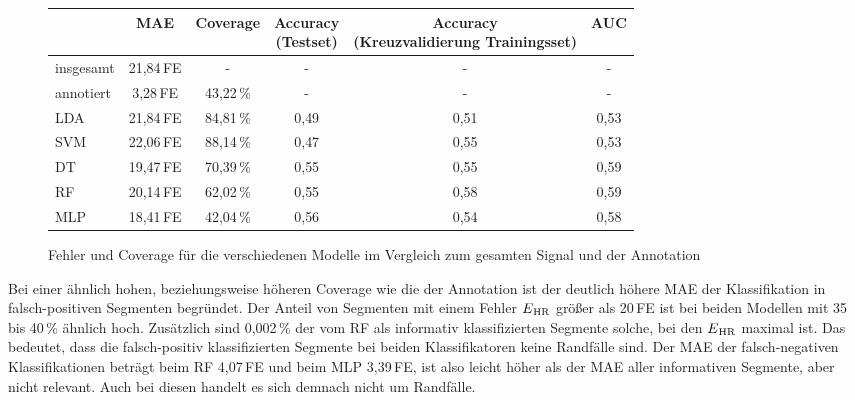 \begin{figure}[H]
	\centering
 	\begin{tabular}{l || c | c | c | c | c}
 					& \ac{MAE}			& Coverage		& \makecell{Accuracy\\(Testset)}	& \makecell{Accuracy\\(Kreuzvalidierung Trainingsset)}	& AUC\\ \hline
 		insgesamt 	& 21{,}84\,\si{FE}	& -				& - 									& -														& -\\
 		annotiert	& 3{,}28\,\si{FE}	& 43{,}22\,\%	& - 									& -														& -\\ \hline
 		\acs{LDA}	& 21{,}84\,\si{FE}	& 84{,}81\,\%	& 0{,}49								& 0{,}51												& 0,53\\
 		\acs{SVM}	& 22{,}06\,\si{FE}	& 88{,}14\,\%	& 0{,}47								& 0{,}55												& 0,53\\
 		\acs{DT}	& 19{,}47\,\si{FE}	& 70{,}39\,\%	& 0{,}55								& 0{,}55												& 0,59\\
 		\acs{RF}	& 20{,}14\,\si{FE}	& 62{,}02\,\%	& 0{,}55								& 0{,}58												& 0,59\\
 		\acs{MLP}	& 18{,}41\,\si{FE}	& 42{,}04\,\%	& 0{,}56								& 0{,}54												& 0,58\\
 	\end{tabular}
 	\caption[Fehler und Coverage der Klassifikation für die verschiedenen Modellen des maschinellen Lernens mit statistischen Merkmalen im Vergleich um gesamten Signal und der Annotation]{Fehler und Coverage für die verschiedenen Modelle im Vergleich zum gesamten Signal und der Annotation}
 	\label{fig:ml-statistical-MAE-Coverage}
\end{figure}

Bei einer ähnlich hohen, beziehungsweise höheren Coverage wie die der Annotation ist der deutlich höhere \ac{MAE} der Klassifikation in falsch-positiven Segmenten begründet. Der Anteil von Segmenten mit einem Fehler $E\textsubscript{HR}$ größer als 20\,\si{FE} ist bei beiden Modellen mit 35 bis 40\,\% ähnlich hoch. Zusätzlich sind 0{,}002\,\% der vom \ac{RF} als informativ klassifizierten Segmente solche, bei den $E\textsubscript{HR}$ maximal ist. Das bedeutet, dass die falsch-positiv klassifizierten Segmente bei beiden Klassifikatoren keine Randfälle sind. Der \ac{MAE} der falsch-negativen Klassifikationen beträgt beim \ac{RF} 4,07\,\si{FE} und beim \ac{MLP} 3{,}39\,\si{FE}, ist also leicht höher als der \ac{MAE} aller informativen Segmente, aber nicht relevant. Auch bei diesen handelt es sich demnach nicht um Randfälle.
 	
